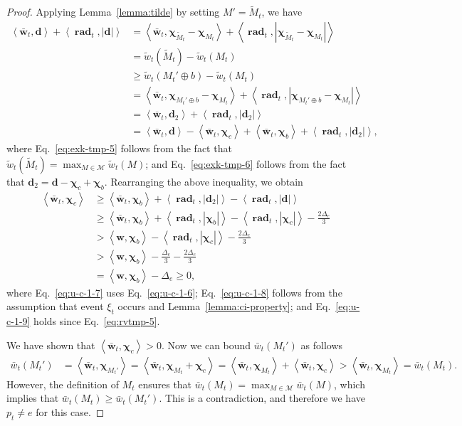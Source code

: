 \documentclass{article}
\newcommand{\M}{\mathcal M}
\DeclareMathOperator{\rad}{rad}
\newcommand{\inn}[1]{\left\langle #1 \right\rangle}
\renewcommand{\vec}[1]{\boldsymbol{#1}}
\begin{document}
\begin{proof}
Applying Lemma~\ref{lemma:tilde} by setting $M' = \tilde M_t$, we have 
\begin{align}
\inn{\vec {\bar w}_t, \vec d}+\inn{\vec \rad_t, |\vec d|}
& = \inn{\vec {\bar w}_t, \vec \chi_{\tilde M_t}-\vec\chi_{M_t}}+\inn{\vec \rad_t, |\vec \chi_{\tilde M_t}-\vec\chi_{M_t}|}\nonumber\\
& = \tilde w_t(\tilde M_t)- \tilde w_t(M_t)\nonumber\\
& \ge \tilde w_t(M_t'\oplus b) - \tilde w_t(M_t)\label{eq:exk-tmp-5}\\
&= \inn{\vec {\bar w}_t, \vec \chi_{M_t' \oplus b}-\vec\chi_{M_t}}+\inn{\vec \rad_t, |\vec \chi_{M_t' \oplus b}-\vec\chi_{M_t}|}\nonumber\\
&= \inn{\vec {\bar w}_t, \vec d_2}+\inn{\vec \rad_t, |\vec d_2|}\nonumber \\
&= \inn{\vec {\bar w}_t, \vec d}-\inn{\vec {\bar w}_t, \vec \chi_c}+\inn{\vec {\bar w}_t,\vec\chi_b}+\inn{\vec \rad_t, |\vec d_2|},\label{eq:exk-tmp-6}
\end{align}
where Eq.~\eqref{eq:exk-tmp-5} follows from the fact that $\tilde w_t(\tilde M_t) = \max_{M\in \M} \tilde w_t(M)$;
and Eq.~\eqref{eq:exk-tmp-6} follows from the fact that $\vec d_2 = \vec d-\vec \chi_{c}+\vec \chi_{b}$.
Rearranging the above inequality, we obtain
\begin{align}
\inn{\vec {\bar w}_t, \vec \chi_c} &\ge \inn{\vec {\bar w}_t, \vec \chi_b}+\inn{\vec \rad_t, |\vec d_2|}-\inn{\vec \rad_t, |\vec d|}\nonumber \\
&\ge  \inn{\vec {\bar w}_t, \vec \chi_b}+
\left\langle \vec \rad_t, |\vec\chi_b| \right\rangle
  -\left\langle \vec \rad_t, |\vec\chi_c| \right\rangle
  -\frac{2\Delta_e}{3} \label{eq:u-c-1-7}\\
&> \inn{\vec w, \vec \chi_b}-\inn{\vec \rad_t, |\vec \chi_c|}-\frac{2\Delta_e}{3} \label{eq:u-c-1-8}\\
&> \inn{\vec w, \vec \chi_b}-\frac{\Delta_e}{3}-\frac{2\Delta_e}{3} \label{eq:u-c-1-9}\\
&= \inn{\vec w, \vec \chi_b}-\Delta_e \ge 0,
\end{align}
where Eq.~\eqref{eq:u-c-1-7} uses Eq.~\eqref{eq:u-c-1-6}; 
Eq.~\eqref{eq:u-c-1-8} follows from the assumption that event $\xi_t$ occurs and Lemma~\ref{lemma:ci-property};
and Eq.~\eqref{eq:u-c-1-9} holds since Eq.~\eqref{eq:rvtmp-5}.

We have shown that $\inn{\vec {\bar w}_t,\vec \chi_c}>0$. Now we can bound $\bar w_t(M_t')$ as follows
\begin{align*}
 \bar w_t(M_t') &= \inn{\vec {\bar w}_t, \vec \chi_{M_t'}} = \inn{\vec {\bar w}_t, \vec \chi_{M_t}+\vec \chi_c} =
 \inn{\vec {\bar w}_t, \vec \chi_{M_t}}+\inn{\vec {\bar w}_t, \vec \chi_c} > \inn{\vec {\bar w}_t, \vec \chi_{M_t}} = \bar w_t(M_t).
\end{align*}
However, the definition of $M_t$ ensures that $\bar w_t(M_t) = \max_{M\in\M} \bar w_t(M)$, which implies that $\bar w_t(M_t) \ge \bar w_t(M_t')$. 
This is a contradiction, and therefore we have $p_t \not=e$ for this case.


\end{proof}
\end{document}
